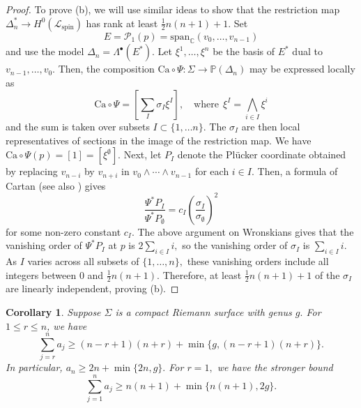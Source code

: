 \documentclass[11pt]{article}
\newtheorem{cor}[theorem]{Corollary}
\theoremstyle{definition}
\newcommand{\C}{\mathbb{C}}
\numberwithin{equation}{section}
\begin{document}
\begin{proof}
    To prove (b), we will use similar ideas to show that the restriction map $\Delta_n^* \to H^0(\mathcal{L}_{\mathrm{spin}})$ has rank at least $\tfrac{1}{2}n(n+1) + 1.$ Set
    \begin{equation*}
        E = \mathcal{P}_1(p) = \mathrm{span}_\C(v_0, \ldots, v_{n-1})
    \end{equation*}
    and use the model $\Delta_n = \Lambda^\bullet(E^*).$ Let $\xi^1, \ldots, \xi^n$ be the basis of $E^*$ dual to $v_{n-1},\ldots,v_0.$
    Then, the composition $\mathrm{Ca} \circ \Psi : \Sigma \to \mathbb{P}(\Delta_n)$ may be expressed locally as
    \begin{equation*}
        \mathrm{Ca} \circ \Psi = \left[ \sum_{I} \sigma_I \xi^I \right], \quad \text{where} \:\: \xi^I = \bigwedge_{i \in I} \xi^i
    \end{equation*}
    and the sum is taken over subsets $I \subset \lbrace 1, \ldots n \rbrace.$ The $\sigma_I$ are then local representatives of sections in the image of the restriction map. We have $\mathrm{Ca} \circ \Psi(p) = [1] = [\xi^{\emptyset}].$ Next, let $P_I$ denote the Pl\"ucker coordinate obtained by replacing $v_{n-i}$ by $v_{n+i}$ in $v_{0} \wedge \cdots \wedge v_{n-1}$ for each $i \in I.$ Then, a formula of Cartan \cite{Cartan81} (see also \cite[\S1.6-1.7]{Hano96}) gives
    \begin{equation*}
        \frac{\Psi^* P_I}{\Psi^* P_{\emptyset}} = c_I\left(\frac{\sigma_I}{\sigma_\emptyset}\right)^2
    \end{equation*}
    for some non-zero constant $c_I.$ The above argument on Wronskians gives that the vanishing order of $\Psi^* P_I$ at $p$ is $2 \sum_{i \in I} i,$ so the vanishing order of $\sigma_{I}$ is $\sum_{i \in I} i.$ As $I$ varies across all subsets of $\lbrace 1, \ldots, n \rbrace,$ these vanishing orders include all integers between $0$ and $\tfrac{1}{2}n(n+1).$ Therefore, at least $\tfrac{1}{2}n(n+1) + 1$ of the $\sigma_I$ are linearly independent, proving (b).
\end{proof}

\begin{cor}\label{cor:asumbound}
    Suppose $\Sigma$ is a compact Riemann surface with genus $g.$ For $1 \leq r \leq n$, we have
    \begin{equation*}
        \sum_{j=r}^n a_j \geq (n-r+1)(n+r) + \min\lbrace g, (n-r+1)(n+r) \rbrace.
    \end{equation*}
    In particular, $a_n \geq 2n + \min\lbrace 2n, g \rbrace.$ For $r=1,$ we have the stronger bound
    \begin{equation*}
        \sum_{j=1}^n a_j \geq n(n+1) + \min\lbrace n(n+1), 2g \rbrace.
    \end{equation*}
\end{cor}
\end{document}
